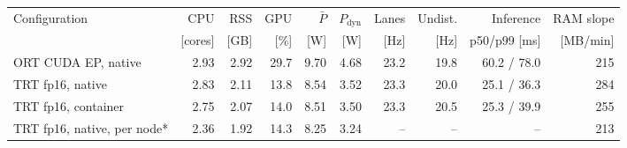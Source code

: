 \begin{tabular}{@{}lrrrrrrrrr@{}}
\toprule
Configuration & CPU & RSS & GPU & $\bar P$ & $P_{\mathrm{dyn}}$ & Lanes & Undist. & Inference & RAM slope \\
 & [cores] & [GB] & [\%] & [W] & [W] & [Hz] & [Hz] & p50/p99 [ms] & [MB/min] \\
\midrule
ORT CUDA EP, native & 2.93 & 2.92 & 29.7 & 9.70 & 4.68 & 23.2 & 19.8 & 60.2 / 78.0 & 215 \\
TRT fp16, native & 2.83 & 2.11 & 13.8 & 8.54 & 3.52 & 23.3 & 20.0 & 25.1 / 36.3 & 284 \\
TRT fp16, container & 2.75 & 2.07 & 14.0 & 8.51 & 3.50 & 23.3 & 20.5 & 25.3 / 39.9 & 255 \\
TRT fp16, native, per node* & 2.36 & 1.92 & 14.3 & 8.25 & 3.24 & -- & -- & -- & 213 \\
\bottomrule
\end{tabular}
